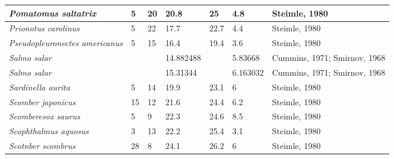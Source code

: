 \documentclass[a4paper]{article} %
\begin{document}
\begin{landscape}
\begin{longtable}[]{|l|p{1.8cm}|p{2cm}|p{2cm}|p{2.15cm}|p{1.9cm}|l|}
    \textit{Pomatomus saltatrix}             & 5                            & 20                         & 20.8                          & 25                                & 4.8                      & Steimle, 1980                \\ \hline
    \textit{Prionotus carolinus}             & 5                            & 22                         & 17.7                          & 22.7                              & 4.4                      & Steimle, 1980                \\ \hline
    \textit{Pseudopleuronectes americanus}   & 5                            & 15                         & 16.4                          & 19.4                              & 3.6                      & Steimle, 1980                \\ \hline
    \textit{Salmo salar}                     &                              &                            & 14.882488                     &                                   & 5.83668                  & Cummins, 1971; Smirnov, 1968 \\ \hline
    \textit{Salmo salar}                     &                              &                            & 15.31344                      &                                   & 6.163032                 & Cummins, 1971; Smirnov, 1968 \\ \hline
    \textit{Sardinella aurita}               & 5                            & 14                         & 19.9                          & 23.1                              & 6                        & Steimle, 1980                \\ \hline
    \textit{Scomber japonicus}               & 15                           & 12                         & 21.6                          & 24.4                              & 6.2                      & Steimle, 1980                \\ \hline
    \textit{Scomberesox saurus}              & 5                            & 9                          & 22.3                          & 24.6                              & 8.5                      & Steimle, 1980                \\ \hline
    \textit{Scophthalmus aquosus}            & 3                            & 13                         & 22.2                          & 25.4                              & 3.1                      & Steimle, 1980                \\ \hline
    \textit{Scotnber scombrus}               & 28                           & 8                          & 24.1                          & 26.2                              & 6                        & Steimle, 1980                \\ \hline

\end{longtable}
\end{landscape}
\end{document}
